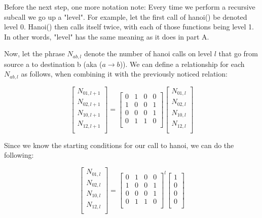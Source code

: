 \documentclass[11pt, letterpaper]{article}
\begin{document}
\begin{enumerate}[label=(\alph*)]
\quad Before the next step, one more notation note: Every time we perform a recursive subcall we go up a "level". For example, let the first call of hanoi() be denoted level 0. Hanoi() then calls itself twice, with each of those functions being level 1. In other words, "level" has the same meaning as it does in part A. 

\quad Now, let the phrase $N_{ab, l}$ denote the number of hanoi calls on level $l$ that go from source a to destination b (aka ($a \rightarrow b$)). We can define a relationship for each $N_{ab, l}$ as follows, when combining it with the previously noticed relation:

\pagebreak

\[
\begin{bmatrix}
N_{01, l+1} \\
N_{02, l+1} \\
N_{10, l+1} \\
N_{12, l+1} \\
\end{bmatrix}
=
\begin{bmatrix}
0 & 1 & 0 & 0 \\
1 & 0 & 0 & 1 \\
0 & 0 & 0 & 1 \\
0 & 1 & 1 & 0 \\
\end{bmatrix}
\begin{bmatrix}
N_{01, l} \\
N_{02, l} \\
N_{10, l} \\
N_{12, l} \\
\end{bmatrix}
\]

Since we know the starting conditions for our call to hanoi, we can do the following:

\[
\begin{bmatrix}
N_{01, l} \\
N_{02, l} \\
N_{10, l} \\
N_{12, l} \\
\end{bmatrix}
=
\begin{bmatrix}
0 & 1 & 0 & 0 \\
1 & 0 & 0 & 1 \\
0 & 0 & 0 & 1 \\
0 & 1 & 1 & 0 \\
\end{bmatrix}^l
\begin{bmatrix}
1 \\
0 \\
0 \\
0 \\
\end{bmatrix}
\]


\end{enumerate}
\end{document}
